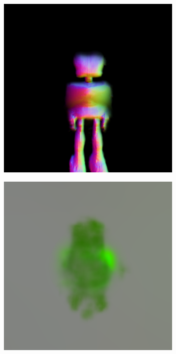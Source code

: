 \begin{figure}[H]
\begin{subfigure}[b]{0.20\textwidth}
        \includegraphics[width=\textwidth]{figures/generationProcess/dreamfusion_plantrobot_10000_part2.png}
        \caption{}
    \end{subfigure}
    \begin{subfigure}[b]{0.20\textwidth}
        \centering
        \includegraphics[width=\textwidth]{figures/generationProcess/dreamfusion_plantrobot_1_part1.png}

\end{subfigure}
\end{figure}
